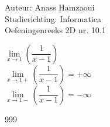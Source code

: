 \documentclass[a4paper]{article}
\begin{document}
  
\noindent \large Auteur: Anass Hamzaoui \\
\noindent \large Studierichting: Informatica\\
\noindent \large Oefeningenreeks 2D nr. 10.1\\

\medskip

\normalsize
$\lim\limits_{x \rightarrow 1}\left(\dfrac{1}{x-1}\right)$ \\

$\lim\limits_{x \rightarrow 1+}\left(\dfrac{1}{x-1}\right)=+\infty$ \\

$\lim\limits_{x \rightarrow 1-}\left(\dfrac{1}{x-1}\right)=-\infty$

\begin{thebibliography}{999}
\end{thebibliography}
\end{document}

